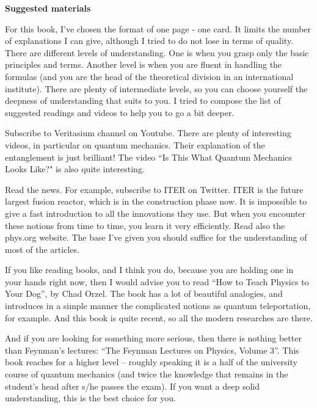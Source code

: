 
\thispagestyle{fancy}
\fancyhf{}
\renewcommand{\headrulewidth}{0pt}
\fancyfoot{}
{\huge{\textbf{Suggested materials}}}
\vskip12pt

For this book, I've chosen the format of one page - one card. It limits the number of explanations I can give, although I tried to do not lose in terms of quality. There are different levels of understanding. One is when you grasp only the basic principles and terms. Another level is when you are fluent in handling the formulas (and you are the head of the theoretical division in an international institute). There are plenty of intermediate levels, so you can choose yourself the deepness of understanding that suits to you. I tried to compose the list of suggested readings and videos to help you to go a bit deeper.

Subscribe to Veritasium channel on Youtube. There are plenty of interesting videos, in particular on quantum mechanics. Their explanation of the entanglement is just brilliant! The video ``Is This What Quantum Mechanics Looks Like?" is also quite interesting.

Read the news. For example, subscribe to ITER on Twitter. ITER is the future largest fusion reactor, which is in the construction phase now. It is impossible to give a fast introduction to all the innovations they use. But when you encounter these notions from time to time, you learn it very efficiently. Read also the phys.org website. The base I've given you should suffice for the understanding of most of the articles.

If you like reading books, and I think you do, because you are holding one in your hands right now, then I would advise you to read ``How to Teach Physics to Your Dog'', by Chad Orzel. The book has a lot of beautiful analogies, and introduces in a simple manner the complicated notions as quantum teleportation, for example. And this book is quite recent, so all the modern researches are there.

And if you are looking for something more serious, then there is nothing better than Feynman's lectures: ``The Feynman Lectures on Physics, Volume 3''. This book reaches for a higher level -- roughly speaking it is a half of the university course of quantum mechanics (and twice the knowledge that remains in the student's head after s/he passes the exam). If you want a deep solid understanding, this is the best choice for you.

\newpage